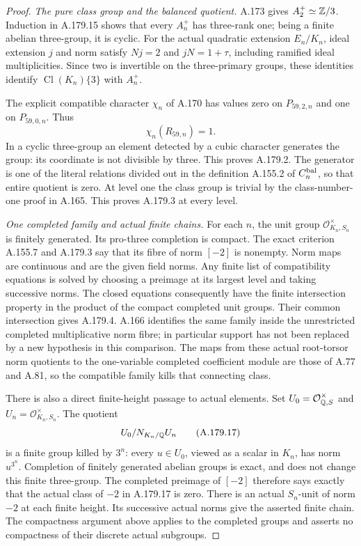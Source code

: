 \begin{proof}
\emph{The pure class group and the balanced quotient.}
A.173 gives \(A_2^+\simeq\mathbb Z/3\).
Induction in A.179.15 shows that every \(A_n^+\) has
three-rank one; being a finite abelian three-group, it is cyclic.
For the actual quadratic extension \(E_n/K_n\), ideal extension
\(j\) and norm satisfy \(Nj=2\) and \(jN=1+\tau\), including
ramified ideal multiplicities.  Since two is invertible on the
three-primary groups, these identities identify
\(\operatorname{Cl}(K_n)\{3\}\) with \(A_n^+\).

The explicit compatible character \(\chi_n\) of A.170 has
values zero on \(P_{59,2,n}\) and one on \(P_{59,0,n}\).
Thus
\[
                             \chi_n(R_{59,n})=1.
\tag{A.179.16}
\]
In a cyclic three-group an element detected by a cubic character
generates the group: its coordinate is not divisible by three.
This proves A.179.2.  The generator is one of the literal
relations divided out in the definition A.155.2 of
\(C_n^{\rm bal}\), so that entire quotient is zero.
At level one the class group is trivial by the class-number-one
proof in A.165.  This proves A.179.3 at every level.

\emph{One completed family and actual finite chains.}
For each \(n\), the unit group \(\mathcal O_{K_n,S_n}^{\times}\)
is finitely generated.  Its pro-three completion is compact.
The exact criterion A.155.7 and A.179.3 say that its fibre of
norm \([-2]\) is nonempty.  Norm maps are continuous and are
the given field norms.  Any finite list of compatibility
equations is solved by choosing a preimage at its largest level
and taking successive norms.  The closed equations consequently
have the finite intersection property in the product of the
compact completed unit groups.  Their common intersection gives
A.179.4.  A.166 identifies the same family inside the unrestricted
completed multiplicative norm fibre; in particular support has
not been replaced by a new hypothesis in this comparison.
The maps from these actual root-torsor norm quotients to the
one-variable completed coefficient module are those of A.77
and A.81, so the compatible family kills that connecting class.

There is also a direct finite-height passage to actual elements.
Set \(U_0=\mathcal O_{\mathbb Q,S}^{\times}\) and
\(U_n=\mathcal O_{K_n,S_n}^{\times}\).
The quotient
\[
                           U_0/N_{K_n/\mathbb Q}U_n
\tag{A.179.17}
\]
is a finite group killed by \(3^n\): every \(u\in U_0\),
viewed as a scalar in \(K_n\), has norm \(u^{3^n}\).
Completion of finitely generated abelian groups is exact, and
does not change this finite three-group.
The completed preimage of \([-2]\) therefore says exactly that
the actual class of \(-2\) in A.179.17 is zero.
There is an actual \(S_n\)-unit of norm \(-2\) at each finite
height.  Its successive actual norms give the asserted finite
chain.  The compactness argument above applies to the completed
groups and asserts no compactness of their discrete actual
subgroups.


\end{proof}
